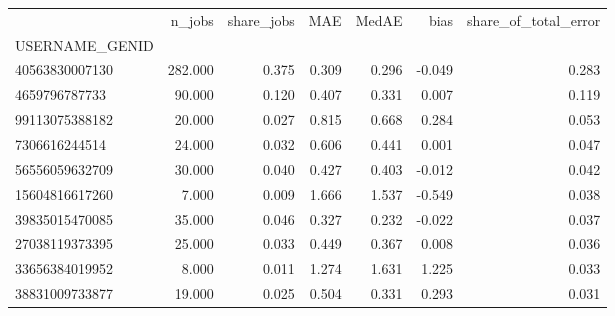 \begin{tabular}{lrrrrrr}
\toprule
 & n_jobs & share_jobs & MAE & MedAE & bias & share_of_total_error \\
USERNAME_GENID &  &  &  &  &  &  \\
\midrule
40563830007130 & 282.000 & 0.375 & 0.309 & 0.296 & -0.049 & 0.283 \\
4659796787733 & 90.000 & 0.120 & 0.407 & 0.331 & 0.007 & 0.119 \\
99113075388182 & 20.000 & 0.027 & 0.815 & 0.668 & 0.284 & 0.053 \\
7306616244514 & 24.000 & 0.032 & 0.606 & 0.441 & 0.001 & 0.047 \\
56556059632709 & 30.000 & 0.040 & 0.427 & 0.403 & -0.012 & 0.042 \\
15604816617260 & 7.000 & 0.009 & 1.666 & 1.537 & -0.549 & 0.038 \\
39835015470085 & 35.000 & 0.046 & 0.327 & 0.232 & -0.022 & 0.037 \\
27038119373395 & 25.000 & 0.033 & 0.449 & 0.367 & 0.008 & 0.036 \\
33656384019952 & 8.000 & 0.011 & 1.274 & 1.631 & 1.225 & 0.033 \\
38831009733877 & 19.000 & 0.025 & 0.504 & 0.331 & 0.293 & 0.031 \\
\bottomrule
\end{tabular}
